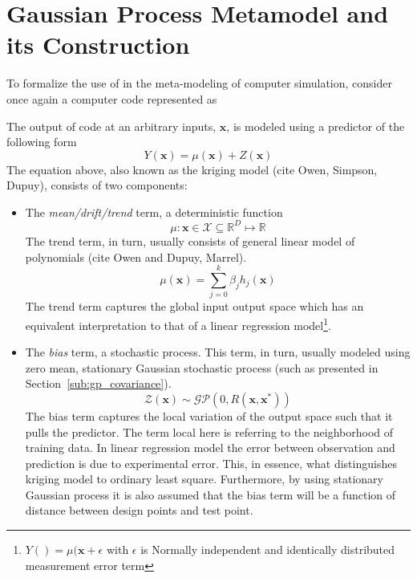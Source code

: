 \section{Gaussian Process Metamodel and its Construction}\label{sec:gp_metamodeling}

To formalize the use of in the meta-modeling of computer simulation, consider once again a computer code represented as 

The output of code at an arbitrary inputs, $\mathbf{x}$, is modeled using a predictor of the following form
\begin{equation}
	Y (\mathbf{x}) = \mu (\mathbf{x}) + Z (\mathbf{x})
\label{eq:kriging_model}
\end{equation}
The equation above, also known as the kriging model (cite Owen, Simpson, Dupuy), consists of two components:
\begin{itemize}
	\item The \emph{mean/drift/trend} term, a deterministic function
	\begin{equation}
		\mu: \mathbf{x} \in \mathcal{X} \subseteq \mathbb{R}^D \mapsto \mathbb{R}
	\label{eq:trend_function_mapping}
	\end{equation}
	The trend term, in turn, usually consists of general linear model of polynomials (cite Owen and Dupuy, Marrel).
	\begin{equation}
		\mu(\mathbf{x}) = \sum_{j=0}^{k} \beta_j h_j(\mathbf{x})
	\label{eq:trend_function_definition}
	\end{equation}
	The trend term captures the global input output space which has an equivalent interpretation to that of a linear regression model\footnote{$Y() = \mu(\mathbf{x} + \epsilon$ with $\epsilon$ is Normally independent and identically distributed measurement error term}.
	\item The \emph{bias} term, a stochastic process. 
	This term, in turn, usually modeled using zero mean, stationary Gaussian stochastic process (such as presented in Section~\ref{sub:gp_covariance}).
	\begin{equation}
		\mathcal{Z}(\mathbf{x}) \sim \mathcal{GP}(0, R(\mathbf{x},\mathbf{x}^*))
	\label{eq:stationary_gp}
	\end{equation}
	The bias term captures the local variation of the output space such that it pulls the predictor.
	The term local here is referring to the neighborhood of training data.
	In linear regression model the error between observation and prediction is due to experimental error.
	This, in essence, what distinguishes kriging model to ordinary least square.
	Furthermore, by using stationary Gaussian process it is also assumed that the bias term will be a function of distance between design points and test point. 
\end{itemize}

